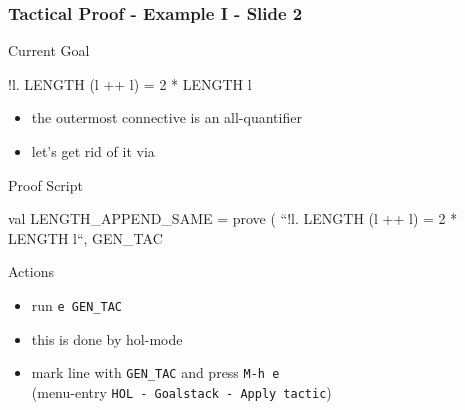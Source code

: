 \begin{frame}[fragile]
\frametitle{Tactical Proof - Example I - Slide 2}

\begin{block}{Current Goal}
\begin{semiverbatim}\small
!l. LENGTH (l ++ l) = 2 * LENGTH l
\end{semiverbatim}
\end{block}

\begin{itemize}
\item the outermost connective is an all-quantifier
\item let's get rid of it via 
\end{itemize}

\begin{block}{Proof Script}
\begin{semiverbatim}\small
val LENGTH_APPEND_SAME = prove (
  ``!l. LENGTH (l ++ l) = 2 * LENGTH l``,
GEN_TAC
\end{semiverbatim}
\end{block}

\begin{block}{Actions}
\begin{itemize}
\item run \texttt{e GEN\_TAC}
\item this is done by hol-mode
\item mark line with \texttt{GEN\_TAC} and press \texttt{M-h e}\\
      (menu-entry \texttt{HOL - Goalstack - Apply tactic})
\end{itemize}
\end{block}
\end{frame}


